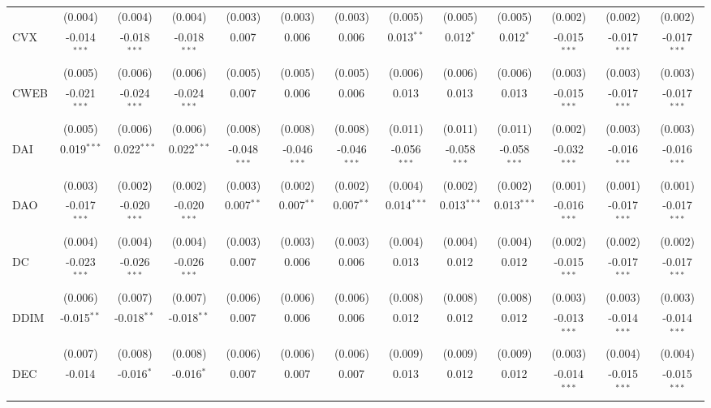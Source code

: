 \begin{table}[!htbp]
\begin{tabular}{@{\extracolsep{5pt}}lcccccccccccc}
  & (0.004) & (0.004) & (0.004) & (0.003) & (0.003) & (0.003) & (0.005) & (0.005) & (0.005) & (0.002) & (0.002) & (0.002) \\
 CVX & -0.014$^{***}$ & -0.018$^{***}$ & -0.018$^{***}$ & 0.007$^{}$ & 0.006$^{}$ & 0.006$^{}$ & 0.013$^{**}$ & 0.012$^{*}$ & 0.012$^{*}$ & -0.015$^{***}$ & -0.017$^{***}$ & -0.017$^{***}$ \\
  & (0.005) & (0.006) & (0.006) & (0.005) & (0.005) & (0.005) & (0.006) & (0.006) & (0.006) & (0.003) & (0.003) & (0.003) \\
 CWEB & -0.021$^{***}$ & -0.024$^{***}$ & -0.024$^{***}$ & 0.007$^{}$ & 0.006$^{}$ & 0.006$^{}$ & 0.013$^{}$ & 0.013$^{}$ & 0.013$^{}$ & -0.015$^{***}$ & -0.017$^{***}$ & -0.017$^{***}$ \\
  & (0.005) & (0.006) & (0.006) & (0.008) & (0.008) & (0.008) & (0.011) & (0.011) & (0.011) & (0.002) & (0.003) & (0.003) \\
 DAI & 0.019$^{***}$ & 0.022$^{***}$ & 0.022$^{***}$ & -0.048$^{***}$ & -0.046$^{***}$ & -0.046$^{***}$ & -0.056$^{***}$ & -0.058$^{***}$ & -0.058$^{***}$ & -0.032$^{***}$ & -0.016$^{***}$ & -0.016$^{***}$ \\
  & (0.003) & (0.002) & (0.002) & (0.003) & (0.002) & (0.002) & (0.004) & (0.002) & (0.002) & (0.001) & (0.001) & (0.001) \\
 DAO & -0.017$^{***}$ & -0.020$^{***}$ & -0.020$^{***}$ & 0.007$^{**}$ & 0.007$^{**}$ & 0.007$^{**}$ & 0.014$^{***}$ & 0.013$^{***}$ & 0.013$^{***}$ & -0.016$^{***}$ & -0.017$^{***}$ & -0.017$^{***}$ \\
  & (0.004) & (0.004) & (0.004) & (0.003) & (0.003) & (0.003) & (0.004) & (0.004) & (0.004) & (0.002) & (0.002) & (0.002) \\
 DC & -0.023$^{***}$ & -0.026$^{***}$ & -0.026$^{***}$ & 0.007$^{}$ & 0.006$^{}$ & 0.006$^{}$ & 0.013$^{}$ & 0.012$^{}$ & 0.012$^{}$ & -0.015$^{***}$ & -0.017$^{***}$ & -0.017$^{***}$ \\
  & (0.006) & (0.007) & (0.007) & (0.006) & (0.006) & (0.006) & (0.008) & (0.008) & (0.008) & (0.003) & (0.003) & (0.003) \\
 DDIM & -0.015$^{**}$ & -0.018$^{**}$ & -0.018$^{**}$ & 0.007$^{}$ & 0.006$^{}$ & 0.006$^{}$ & 0.012$^{}$ & 0.012$^{}$ & 0.012$^{}$ & -0.013$^{***}$ & -0.014$^{***}$ & -0.014$^{***}$ \\
  & (0.007) & (0.008) & (0.008) & (0.006) & (0.006) & (0.006) & (0.009) & (0.009) & (0.009) & (0.003) & (0.004) & (0.004) \\
 DEC & -0.014$^{}$ & -0.016$^{*}$ & -0.016$^{*}$ & 0.007$^{}$ & 0.007$^{}$ & 0.007$^{}$ & 0.013$^{}$ & 0.012$^{}$ & 0.012$^{}$ & -0.014$^{***}$ & -0.015$^{***}$ & -0.015$^{***}$ \\

\end{tabular}
\end{table}
